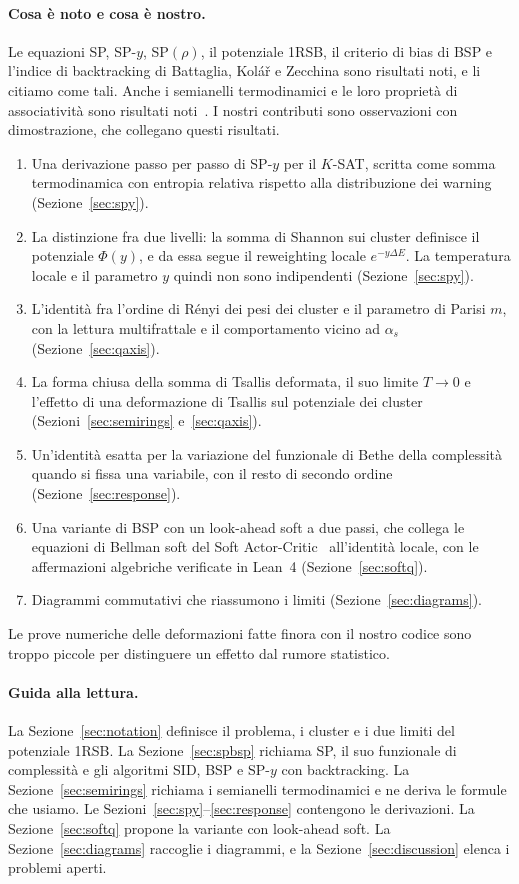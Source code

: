 \paragraph{Cosa è noto e cosa è nostro.}
Le equazioni SP, SP-$y$, SP$(\rho)$, il potenziale 1RSB, il criterio di bias di BSP e l'indice di backtracking di Battaglia, Kolář e Zecchina sono risultati noti, e li citiamo come tali.
Anche i semianelli termodinamici e le loro proprietà di associatività sono risultati noti~\citep{marcolli2014thermodynamic}.
I nostri contributi sono osservazioni con dimostrazione, che collegano questi risultati.
\begin{enumerate}
\item Una derivazione passo per passo di SP-$y$ per il $K$-SAT, scritta come somma termodinamica con entropia relativa rispetto alla distribuzione dei warning (Sezione~\ref{sec:spy}).
\item La distinzione fra due livelli: la somma di Shannon sui cluster definisce il potenziale $\Phi(y)$, e da essa segue il reweighting locale $e^{-y\Delta E}$. La temperatura locale e il parametro $y$ quindi non sono indipendenti (Sezione~\ref{sec:spy}).
\item L'identità fra l'ordine di Rényi dei pesi dei cluster e il parametro di Parisi $m$, con la lettura multifrattale e il comportamento vicino ad $\alpha_s$ (Sezione~\ref{sec:qaxis}).
\item La forma chiusa della somma di Tsallis deformata, il suo limite $T\to0$ e l'effetto di una deformazione di Tsallis sul potenziale dei cluster (Sezioni~\ref{sec:semirings} e~\ref{sec:qaxis}).
\item Un'identità esatta per la variazione del funzionale di Bethe della complessità quando si fissa una variabile, con il resto di secondo ordine (Sezione~\ref{sec:response}).
\item Una variante di BSP con un look-ahead soft a due passi, che collega le equazioni di Bellman soft del Soft Actor-Critic~\citep{haarnoja2018soft} all'identità locale, con le affermazioni algebriche verificate in Lean~4 (Sezione~\ref{sec:softq}).
\item Diagrammi commutativi che riassumono i limiti (Sezione~\ref{sec:diagrams}).
\end{enumerate}
Le prove numeriche delle deformazioni fatte finora con il nostro codice sono troppo piccole per distinguere un effetto dal rumore statistico.

\paragraph{Guida alla lettura.}
La Sezione~\ref{sec:notation} definisce il problema, i cluster e i due limiti del potenziale 1RSB.
La Sezione~\ref{sec:spbsp} richiama SP, il suo funzionale di complessità e gli algoritmi SID, BSP e SP-$y$ con backtracking.
La Sezione~\ref{sec:semirings} richiama i semianelli termodinamici e ne deriva le formule che usiamo.
Le Sezioni~\ref{sec:spy}--\ref{sec:response} contengono le derivazioni.
La Sezione~\ref{sec:softq} propone la variante con look-ahead soft.
La Sezione~\ref{sec:diagrams} raccoglie i diagrammi, e la Sezione~\ref{sec:discussion} elenca i problemi aperti.

